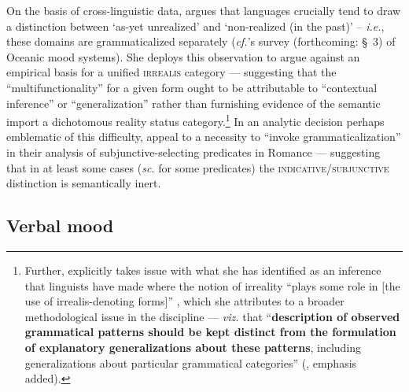 On the basis of cross-linguistic data, \citet[138\textit{ff}]{Cristofaro2012} argues that languages crucially tend to draw a distinction between `as-yet unrealized' and `non-realized (in the past)' -- \textit{i.e.}, these domains are grammaticalized separately (\textit{cf.}\citeauthor{VonPrincea}'s survey (forthcoming: \S~3) of Oceanic mood systems). She deploys this observation to argue against an empirical basis for a unified \textsc{irrealis} category --- suggesting that the ``multifunctionality'' for a given form ought to be attributable to ``contextual inference'' or ``generalization'' rather than furnishing evidence of the semantic import a dichotomous reality status category.\footnote{Further, \citeauthor{Cristofaro2012} explicitly takes issue with what she has identified as an inference that linguists have made where the notion of irreality ``plays some role in [the use of irrealis-denoting forms]'' \citeyearpar[132]{Cristofaro2012}, which she attributes to a broader methodological issue in the discipline --- \textit{viz.} that ``\textbf{description of observed grammatical patterns should be kept distinct from the formulation of explanatory generalizations about these patterns}, including generalizations about particular grammatical categories'' (\citeyear[145]{Cristofaro2012}, emphasis added).}  In an analytic decision perhaps emblematic of this difficulty, \citet[467]{Portner2012} appeal to a necessity to ``invoke  grammaticalization'' in their analysis of subjunctive-selecting predicates in Romance --- suggesting that in at least some cases (\textit{sc.} for some predicates) the \textsc{indicative/subjunctive} distinction is semantically inert.
	
	
\subsection{Verbal mood}\label{sec:mood-lit}

